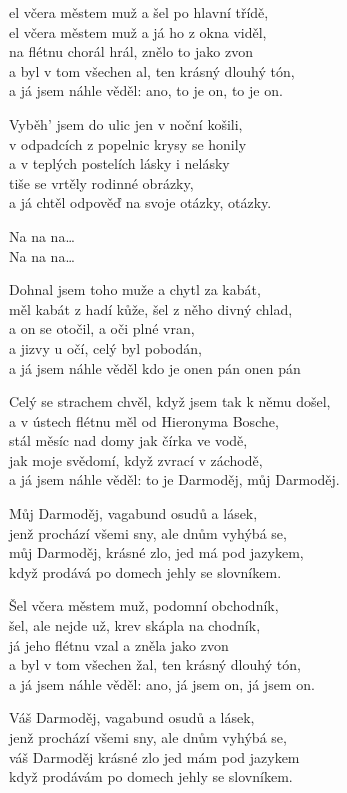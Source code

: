 
\ve{}
el včera městem muž a šel po hlavní třídě, \\
el včera městem muž a já ho z okna viděl, \\
na flétnu chorál hrál, znělo to jako zvon\\
a byl v tom všechen al, ten krásný dlouhý tón,\\
a já jsem náhle věděl: ano, to je on, to je on.

\ve{}
Vyběh' jsem do ulic jen v noční košili,\\
v odpadcích z popelnic krysy se honily\\
a v teplých postelích lásky i nelásky\\
tiše se vrtěly rodinné obrázky,\\
a já chtěl odpověď na svoje otázky, otázky.

\cho{}
Na na na\ldots{} \\
Na na na\ldots{} 

\ve{}
Dohnal jsem toho muže a chytl za kabát,\\
měl kabát z hadí kůže, šel z něho divný chlad,\\
a on se otočil, a oči plné vran,\\
a jizvy u očí, celý byl pobodán,\\
a já jsem náhle věděl kdo je onen pán onen pán

\ve{}
Celý se strachem chvěl, když jsem tak k němu došel,\\
a v ústech flétnu měl od Hieronyma Bosche,\\
stál měsíc nad domy jak čírka ve vodě,\\
jak moje svědomí, když zvrací v záchodě,\\
a já jsem náhle věděl: to je Darmoděj, můj Darmoděj.

\cho{}
Můj Darmoděj, vagabund osudů a lásek,\\
jenž prochází všemi sny, ale dnům vyhýbá se,\\
můj Darmoděj, krásné zlo, jed má pod jazykem,\\
když prodává po domech jehly se slovníkem.

\ve{}
Šel včera městem muž, podomní obchodník,\\
šel, ale nejde už, krev skápla na chodník,\\
já jeho flétnu vzal a zněla jako zvon\\
a byl v tom všechen žal, ten krásný dlouhý tón,\\
a já jsem náhle věděl: ano, já jsem on, já jsem on.

\cho{}
Váš Darmoděj, vagabund osudů a lásek,\\
jenž prochází všemi sny, ale dnům vyhýbá se,\\
váš Darmoděj krásné zlo jed mám pod jazykem\\
když prodávám po domech jehly se slovníkem. 

\esong